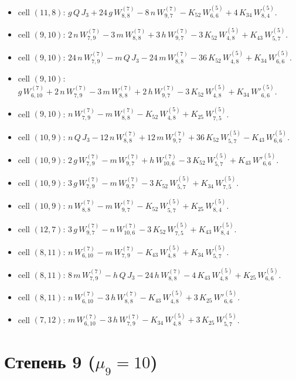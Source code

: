\begin{itemize}
\item cell $(11,8)$: $g\,Q\,J_3 + 24\,g\,W^{(7)}_{8,8} - 8\,n\,W^{(7)}_{9,7} - K_{52}\,W^{(5)}_{6,6} + 4\,K_{34}\,W^{(5)}_{8,4}$.
\item cell $(9,10)$: $2\,n\,W^{(7)}_{7,9} - 3\,m\,W^{(7)}_{8,8} + 3\,h\,W^{(7)}_{9,7} - 3\,K_{52}\,W^{(5)}_{4,8} + K_{43}\,W^{(5)}_{5,7}$.
\item cell $(9,10)$: $24\,n\,W^{(7)}_{7,9} - m\,Q\,J_3 - 24\,m\,W^{(7)}_{8,8} - 36\,K_{52}\,W^{(5)}_{4,8} + K_{34}\,W^{(5)}_{6,6}$.
\item cell $(9,10)$: $g\,W^{(7)}_{6,10} + 2\,n\,W^{(7)}_{7,9} - 3\,m\,W^{(7)}_{8,8} + 2\,h\,W^{(7)}_{9,7} - 3\,K_{52}\,W^{(5)}_{4,8} + K_{34}\,W'^{(5)}_{6,6}$.
\item cell $(9,10)$: $n\,W^{(7)}_{7,9} - m\,W^{(7)}_{8,8} - K_{52}\,W^{(5)}_{4,8} + K_{25}\,W^{(5)}_{7,5}$.
\item cell $(10,9)$: $n\,Q\,J_3 - 12\,n\,W^{(7)}_{8,8} + 12\,m\,W^{(7)}_{9,7} + 36\,K_{52}\,W^{(5)}_{5,7} - K_{43}\,W^{(5)}_{6,6}$.
\item cell $(10,9)$: $2\,g\,W^{(7)}_{7,9} - m\,W^{(7)}_{9,7} + h\,W^{(7)}_{10,6} - 3\,K_{52}\,W^{(5)}_{5,7} + K_{43}\,W'^{(5)}_{6,6}$.
\item cell $(10,9)$: $3\,g\,W^{(7)}_{7,9} - m\,W^{(7)}_{9,7} - 3\,K_{52}\,W^{(5)}_{5,7} + K_{34}\,W^{(5)}_{7,5}$.
\item cell $(10,9)$: $n\,W^{(7)}_{8,8} - m\,W^{(7)}_{9,7} - K_{52}\,W^{(5)}_{5,7} + K_{25}\,W^{(5)}_{8,4}$.
\item cell $(12,7)$: $3\,g\,W^{(7)}_{9,7} - n\,W^{(7)}_{10,6} - 3\,K_{52}\,W^{(5)}_{7,5} + K_{43}\,W^{(5)}_{8,4}$.
\item cell $(8,11)$: $n\,W^{(7)}_{6,10} - m\,W^{(7)}_{7,9} - K_{43}\,W^{(5)}_{4,8} + K_{34}\,W^{(5)}_{5,7}$.
\item cell $(8,11)$: $8\,m\,W^{(7)}_{7,9} - h\,Q\,J_3 - 24\,h\,W^{(7)}_{8,8} - 4\,K_{43}\,W^{(5)}_{4,8} + K_{25}\,W^{(5)}_{6,6}$.
\item cell $(8,11)$: $n\,W^{(7)}_{6,10} - 3\,h\,W^{(7)}_{8,8} - K_{43}\,W^{(5)}_{4,8} + 3\,K_{25}\,W'^{(5)}_{6,6}$.
\item cell $(7,12)$: $m\,W^{(7)}_{6,10} - 3\,h\,W^{(7)}_{7,9} - K_{34}\,W^{(5)}_{4,8} + 3\,K_{25}\,W^{(5)}_{5,7}$.
\end{itemize}

\section*{Степень 9 ($\mu_9 = 10$)}

